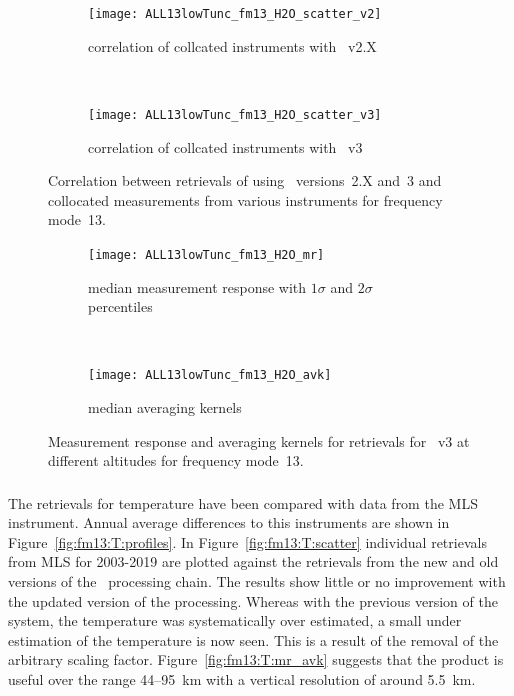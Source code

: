 \begin{figure}[tbhp]
    \centering
    \begin{subfigure}[b]{0.49\textwidth}
        \texttt{[image: ALL13lowTunc\_fm13\_H2O\_scatter\_v2]}
        \caption{correlation of collcated instruments with \smr~v2.X}
        \label{fig:fm13:H2O:scatter:v2}
    \end{subfigure}
    \,
    \begin{subfigure}[b]{0.49\textwidth}
        \texttt{[image: ALL13lowTunc\_fm13\_H2O\_scatter\_v3]}
        \caption{correlation of collcated instruments with \smr~v3}
        \label{fig:fm13:H2O:scatter:v3}
    \end{subfigure}
    \caption{Correlation between retrievals of  using \smr\
    versions~2.X and~3 and collocated measurements from various instruments
    for frequency mode~13.}
    \label{fig:fm13:H2O:scatter}
\end{figure}

\begin{figure}[tbhp]
    \centering
    \begin{subfigure}[b]{0.49\textwidth}
        \texttt{[image: ALL13lowTunc\_fm13\_H2O\_mr]}
        \caption{median measurement response with $1\sigma$ and $2\sigma$
        percentiles}
        \label{fig:fm13:H2O:mr}
    \end{subfigure}
    \,
    \begin{subfigure}[b]{0.49\textwidth}
        \texttt{[image: ALL13lowTunc\_fm13\_H2O\_avk]}
        \caption{median averaging kernels\newline~}
        \label{fig:fm13:H2O:avk}
    \end{subfigure}
    \caption{Measurement response and averaging kernels for 
    retrievals for \smr~v3 at different altitudes for frequency mode~13.}
    \label{fig:fm13:H2O:mr_avk}
\end{figure}


\newpage
\subsubsection{}
\label{sec:fm13:comparison:temperature}
The retrievals for temperature have been compared with data from the MLS
instrument. Annual average differences to this instruments are shown in
Figure~\ref{fig:fm13:T:profiles}. In Figure~\ref{fig:fm13:T:scatter} individual
retrievals from MLS for 2003-2019 are plotted against the retrievals
from the new and old versions of the \smr\ processing chain. The results show
little or no improvement with the updated version of the processing. Whereas
with the previous version of the system, the temperature was systematically
over estimated, a small under estimation of the temperature is now seen. This
is a result of the removal of the arbitrary scaling factor.
Figure~\ref{fig:fm13:T:mr_avk} suggests that the product is useful over the
range 44--95~km with a vertical resolution of around 5.5~km.

